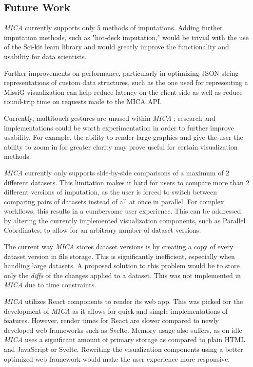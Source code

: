 \documentclass[a4paper, 11pt]{article}
\newcommand{\mica}{\textit{MICA }}
\begin{document}
\subsection{Future Work} 

\mica currently supports only 5 methods of imputations. Adding further
imputation methods, such as "hot-deck imputation," would be trivial with the use
of the Sci-kit learn library and would greatly improve the functionality and
usability for data scientists. 

Further improvements on performance, particularly in optimizing JSON string
representations of custom data structures, such as the one used for representing
a MissiG visualization can help reduce latency on the client side as well as
reduce round-trip time on requests made to the MICA API. 

Currently, multitouch gestures are unused within \mica; research and
implementations could be worth experimentation in order to further improve
usability. For example, the ability to render large graphics and give the user
the ability to zoom in for greater clarity may prove useful for certain
visualization methods.

\mica currently only supports side-by-side comparisons of a maximum of 2
different datasets. This limitation makes it hard for users to compare more
than 2 different versions of imputation, as the user is forced to switch between
comparing pairs of datasets instead of all at once in parallel. For complex
workflows, this results in a cumbersome user experience. This can be addressed
by altering the currently implemented visualization components, such as
Parallel Coordinates, to allow for an arbitrary number of dataset versions.

The current way \mica stores dataset versions is by creating a copy of every
dataset version in file storage. This is significantly inefficient, especially
when handling large datasets. A proposed solution to this problem would be to
store only the \textit{diffs} of the changes applied to a dataset. This was not
implemented in \mica due to time constraints.

\mica utilizes React components to render its web app. This was picked for the
development of \mica as it allows for quick and simple implementations of
features. However, render times for React are slower compared to newly
developed web frameworks such as Svelte. Memory usage also suffers, as on idle
\mica uses a significant amount of primary storage as compared to plain HTML
and JavaScript or Svelte. Rewriting the visualization components using a better
optimized web framework would make the user experience more responsive. 
\end{document}
